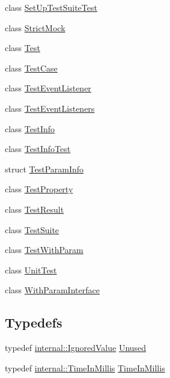 \begin{DoxyCompactItemize}
\item 
class \mbox{\hyperlink{classtesting_1_1_set_up_test_suite_test}{Set\+Up\+Test\+Suite\+Test}}
\item 
class \mbox{\hyperlink{classtesting_1_1_strict_mock}{Strict\+Mock}}
\item 
class \mbox{\hyperlink{classtesting_1_1_test}{Test}}
\item 
class \mbox{\hyperlink{classtesting_1_1_test_case}{Test\+Case}}
\item 
class \mbox{\hyperlink{classtesting_1_1_test_event_listener}{Test\+Event\+Listener}}
\item 
class \mbox{\hyperlink{classtesting_1_1_test_event_listeners}{Test\+Event\+Listeners}}
\item 
class \mbox{\hyperlink{classtesting_1_1_test_info}{Test\+Info}}
\item 
class \mbox{\hyperlink{classtesting_1_1_test_info_test}{Test\+Info\+Test}}
\item 
struct \mbox{\hyperlink{structtesting_1_1_test_param_info}{Test\+Param\+Info}}
\item 
class \mbox{\hyperlink{classtesting_1_1_test_property}{Test\+Property}}
\item 
class \mbox{\hyperlink{classtesting_1_1_test_result}{Test\+Result}}
\item 
class \mbox{\hyperlink{classtesting_1_1_test_suite}{Test\+Suite}}
\item 
class \mbox{\hyperlink{classtesting_1_1_test_with_param}{Test\+With\+Param}}
\item 
class \mbox{\hyperlink{classtesting_1_1_unit_test}{Unit\+Test}}
\item 
class \mbox{\hyperlink{classtesting_1_1_with_param_interface}{With\+Param\+Interface}}
\end{DoxyCompactItemize}
\subsection*{Typedefs}
\begin{DoxyCompactItemize}
\item 
typedef \mbox{\hyperlink{classtesting_1_1internal_1_1_ignored_value}{internal\+::\+Ignored\+Value}} \mbox{\hyperlink{namespacetesting_a603e329ec0263ebfcf16f712810bd511}{Unused}}
\item 
typedef \mbox{\hyperlink{namespacetesting_1_1internal_a5eed833eddf9ea8ca45546c125f4ef0c}{internal\+::\+Time\+In\+Millis}} \mbox{\hyperlink{namespacetesting_a992de1d091ce660f451d1e8b3ce30fd6}{Time\+In\+Millis}}
\end{DoxyCompactItemize}
